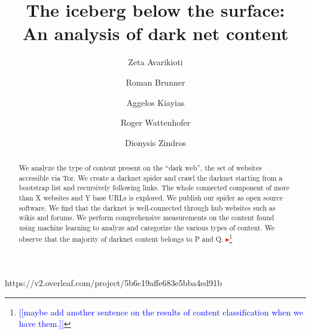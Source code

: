 \documentclass[USenglish,oneside,twocolumn]{article}
\newcommand{\nb}[1]{\textcolor{red}{$\blacktriangleright$}\footnote{\textcolor{blue}{[[#1]]}}}
\begin{document}
 

  \author*[1]{Zeta Avarikioti}

  \author[2]{Roman Brunner}
https://v2.overleaf.com/project/5b6c19affe683e5bba4ed91b
  \author[3]{Aggelos Kiayias}

  \author[4]{Roger Wattenhofer}

  \author[5]{Dionysis Zindros}






  \title{\huge The iceberg below the surface:\\ An analysis of dark net content}



  \begin{abstract}
{We analyze the type of content present on the “dark web”, the set of websites accessible via Tor. We create a darknet spider and crawl the darknet starting from a bootstrap list and recursively following links. The whole connected component of more than X websites and Y base URLs is explored. We publish our spider as open source software. We find that the darknet is well-connected through hub websites such as wikis and forums. We perform comprehensive measurements on the content found using machine learning to analyze and categorize the various types of content. We observe that the majority of darknet content belongs to P and Q. \nb{maybe add another sentence on the results of content classification when we have them.}
}
\end{abstract}


 
\end{document}
